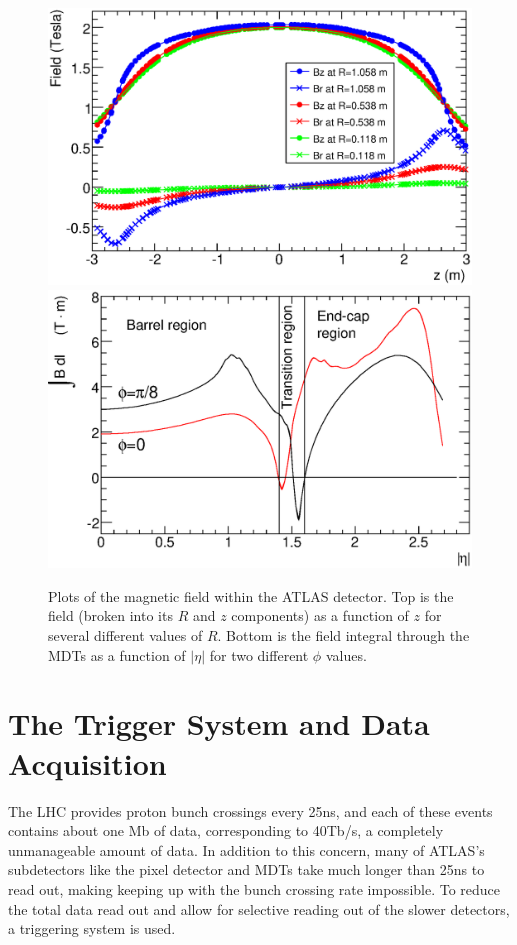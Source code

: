 \begin{centering}
\begin{figure}[!htb]
\myfloatalign
\includegraphics[width=.90\linewidth]{figures/atlas/solMeasB.eps}
\includegraphics[width=.90\linewidth]{figures/atlas/IBdl.eps}
\caption{Plots of the magnetic field within the ATLAS detector. Top is the field (broken into its $R$ and $z$ components) as a function of $z$ for several different values of $R$. Bottom is the field integral through the \acp{MDT} as a function of $|\eta|$ for two different $\phi$ values. }
\label{fig:bfield}
\end{figure}
\end{centering}

\section{The Trigger System and Data Acquisition}
\label{sec:Trigger}

The \ac{LHC} provides proton bunch crossings every 25ns, and each of these events contains about one Mb of data, corresponding to 40Tb/s, a completely unmanageable amount of data. In addition to this concern, many of ATLAS's subdetectors like the pixel detector and \acp{MDT} take much longer than 25ns to read out, making keeping up with the bunch crossing rate impossible. To reduce the total data read out and allow for selective reading out of the slower detectors, a triggering system is used. 

